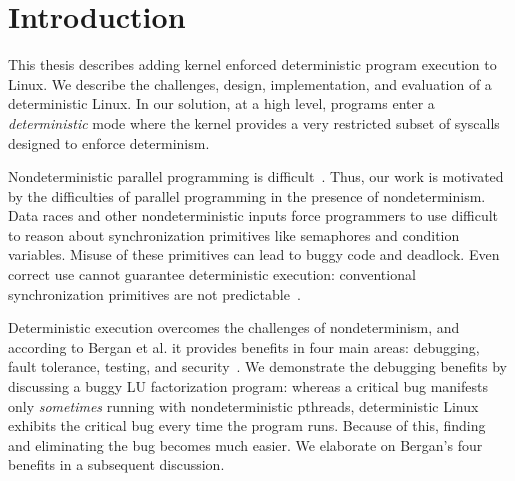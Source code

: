 \section{Introduction}
\label{s:intro}

This thesis describes adding kernel enforced deterministic program execution to
Linux. We describe the challenges, design, implementation, and evaluation of
a deterministic Linux.
In our solution, at a high level, programs enter a \emph{deterministic}
mode where the kernel provides a very restricted subset of syscalls designed to
enforce determinism.
\iffalse
The kernel enforces determinism, thus making it impossible
for user programs to possibly behave nondeterministically, even by deliberate
design. Internal nondeterministic inputs like hardware data races are entirely
eliminated, and explicitly nondeterministic inputs like user input or time of
day become controllable explicit I/O.
\fi

\iffalse
A program is deterministic if for a fixed input, the program always returns the
same output. This is desirable, because it simplifies testing and debugging of
ever more ubiquitous parallel programs. Linux's parallel programming model is
inherently nondeterministic, but having the option to run deterministically
would be a great feature as computing moves towards using multiple cores.
\fi

Nondeterministic parallel programming is difficult~\cite{lee2006problem}. Thus,
our work is motivated by the difficulties of parallel programming in the
presence of nondeterminism.
Data races and other nondeterministic inputs force programmers to use
difficult to reason about synchronization primitives like semaphores and
condition variables. Misuse of these primitives can lead to buggy code and
deadlock. Even correct use cannot guarantee deterministic execution:
conventional synchronization primitives are not predictable~\cite{Aviram10}.

Deterministic execution overcomes the challenges of nondeterminism, and
according to Bergan et al. it provides benefits in four main areas: debugging,
fault tolerance, testing, and security~\cite{Bergan11}. We demonstrate the
debugging benefits by discussing a buggy LU factorization program: whereas a
critical bug manifests only \emph{sometimes} running with nondeterministic
pthreads, deterministic Linux exhibits the critical bug every time the program
runs. Because of this, finding and eliminating the bug becomes much easier. We
elaborate on Bergan's four benefits in a subsequent discussion.

